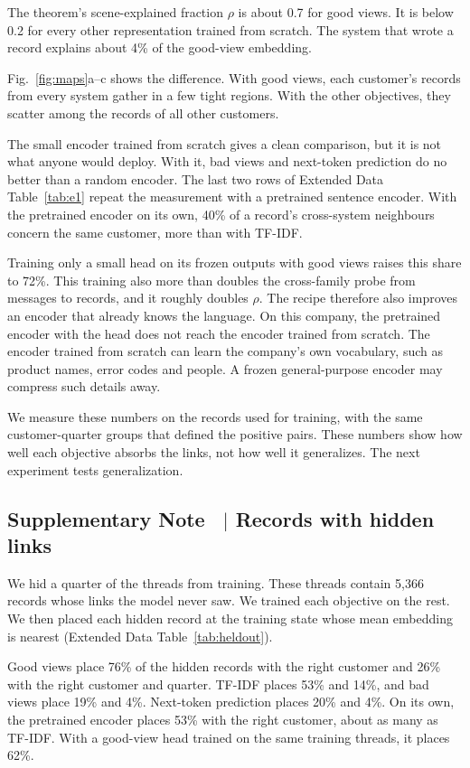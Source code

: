 \documentclass[11pt]{article}
\newcounter{suppnote}
\newcommand{\suppnote}[2]{\refstepcounter{suppnote}\label{#2}\subsection{Supplementary Note \thesuppnote\ $|$ #1}}
\begin{document}
The theorem's scene-explained fraction $\rho$ is about 0.7 for good views. It is below 0.2 for every other representation trained from scratch. The system that wrote a record explains about 4\% of the good-view embedding.

Fig.~\ref{fig:maps}a--c shows the difference. With good views, each customer's records from every system gather in a few tight regions. With the other objectives, they scatter among the records of all other customers.

The small encoder trained from scratch gives a clean comparison, but it is not what anyone would deploy. With it, bad views and next-token prediction do no better than a random encoder. The last two rows of Extended Data Table~\ref{tab:e1} repeat the measurement with a pretrained sentence encoder. With the pretrained encoder on its own, 40\% of a record's cross-system neighbours concern the same customer, more than with TF-IDF.

Training only a small head on its frozen outputs with good views raises this share to 72\%. This training also more than doubles the cross-family probe from messages to records, and it roughly doubles $\rho$. The recipe therefore also improves an encoder that already knows the language. On this company, the pretrained encoder with the head does not reach the encoder trained from scratch. The encoder trained from scratch can learn the company's own vocabulary, such as product names, error codes and people. A frozen general-purpose encoder may compress such details away.

We measure these numbers on the records used for training, with the same customer-quarter groups that defined the positive pairs. These numbers show how well each objective absorbs the links, not how well it generalizes. The next experiment tests generalization.

\suppnote{Records with hidden links}{sec:heldout}
We hid a quarter of the threads from training. These threads contain 5{,}366 records whose links the model never saw. We trained each objective on the rest. We then placed each hidden record at the training state whose mean embedding is nearest (Extended Data Table~\ref{tab:heldout}).

Good views place 76\% of the hidden records with the right customer and 26\% with the right customer and quarter. TF-IDF places 53\% and 14\%, and bad views place 19\% and 4\%. Next-token prediction places 20\% and 4\%. On its own, the pretrained encoder places 53\% with the right customer, about as many as TF-IDF. With a good-view head trained on the same training threads, it places 62\%.
\end{document}
